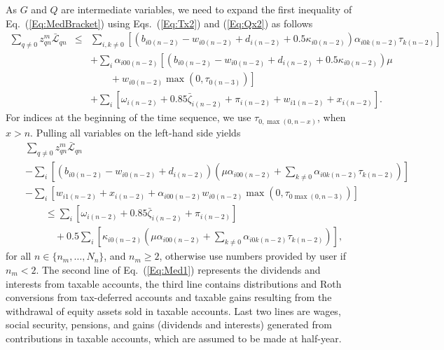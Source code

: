 \documentclass{report}[fleqn,11pt]
\begin{document}
	As $G$ and $Q$ are intermediate variables, we need to expand the first inequality of Eq.~(\ref{Eq:MedBracket})
	using Eqs.~(\ref{Eq:Tx2}) and (\ref{Eq:Qx2}) as follows
	\begin{eqnarray}
		\sum_{q\neq 0} z_{qn}^m \bar{\mathcal{L}}_{qn} &\le &
		\sum_{i,k\neq 0} [(b_{i0(n-2)} - w_{i0(n-2)} + d_{i(n-2)}
		+ 0.5\kappa_{i0(n-2)})\alpha_{i0k(n-2)}\tau_{k(n-2)}] \nonumber\\
		&& + \sum_i \alpha_{i00(n-2)}\left[(b_{i0(n-2)} - w_{i0(n-2)} + d_{i(n-2)} + 0.5\kappa_{i0(n-2)})\mu\right.
		\nonumber\\
		&& \qquad + \left.w_{i0(n-2)}{\max(0, \tau_{0(n-3)})}\right]
		\nonumber \\
		&& + \sum_i [\omega_{i(n-2)} + 0.85\bar{\zeta}_{i(n-2)} + \pi_{i(n-2)} + w_{i1(n-2)} + x_{i(n-2)} ].
	\end{eqnarray}
	For indices at the beginning of the time sequence, we use $\tau_{0, \max(0, n-x)}$, when $x>n$.
	Pulling all variables on the left-hand side yields
	\begin{eqnarray}
		\label{Eq:Med1}
		&& \sum_{q  \neq 0} z_{qn}^m \bar{\mathcal{L}}_{qn} \nonumber\\
		&& - \sum_{i} \left[(b_{i0(n-2)} - w_{i0(n-2)} + d_{i(n-2)})
		\left(
		\mu\alpha_{i00(n-2)}
		+ \sum_{k\neq 0} \alpha_{i0k(n-2)}\tau_{k(n-2)}
		\right)\right]
		\nonumber\\
		&& - \sum_i \left[w_{i1(n-2)} + x_{i(n-2)}
		 + \alpha_{i00(n-2)}w_{i0(n-2)}\max(0, \tau_{0\max(0, n-3)})\right] \nonumber\\
		&& \qquad \le \sum_i [\omega_{i(n-2)} + 0.85\bar{\zeta}_{i(n-2)} + \pi_{i(n-2)} ] \nonumber\\
		&& \qquad \quad + 0.5 \sum_{i} \left[\kappa_{i0(n-2)}
		\left(
		\mu\alpha_{i00(n-2)} + 
		\sum_{k\neq 0}
		\alpha_{i0k(n-2)}\tau_{k(n-2)}\right)\right],
	\end{eqnarray}
	for all $n \in \{n_m, \ldots, N_n\}$, and $n_m \ge 2$,
	otherwise use numbers provided by user if $n_m < 2$.
	The second line of Eq.~(\ref{Eq:Med1}) represents the dividends and interests
	from taxable accounts, the third line
	contains distributions and Roth conversions from tax-deferred accounts and taxable gains
	resulting from the withdrawal of equity assets sold in taxable accounts. Last two lines are wages,
	social security, pensions, and gains (dividends and interests) generated
	from contributions in taxable accounts, which are assumed to be made at half-year.
\end{document}
